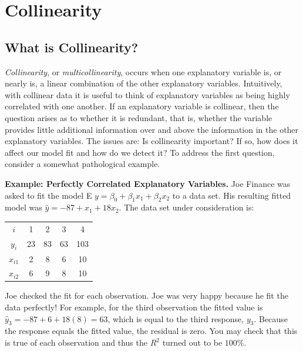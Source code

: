\linejed

\section{Collinearity}

\subsection{What is Collinearity?}

\textit{Collinearity}, or \textit{multicollinearity}, occurs when
one explanatory variable is, or nearly is, a linear combination of
the other explanatory variables. Intuitively, with collinear data it
is useful to think of explanatory variables as being highly
correlated with one another. If an explanatory variable is
collinear, then the question arises as to whether it is redundant,
that is, whether the variable provides little additional information
over and above the information in the other explanatory variables.
The issues are: Is collinearity important? If so, how does it affect
our model fit and how do we detect it? To address the first
question, consider a somewhat pathological example.

\linejed

\textbf{Example: Perfectly Correlated Explanatory Variables.} Joe
Finance was asked to fit the model E
$y=\beta_0+\beta_1x_1+\beta_2x_2$ to a data set. His resulting
fitted model was $\hat{y}=-87+x_1+18x_2.$  The data set under
consideration is:

\begin{center}
\begin{tabular}{ccccc}
\hline
$i$ & 1 & 2 & 3 & 4 \\
$y_i$ & 23 & 83 & 63 & 103 \\
$x_{i1}$ & 2 & 8 & 6 & 10 \\
$x_{i2}$ & 6 & 9 & 8 & 10 \\ \hline
\end{tabular}%
\end{center}

Joe checked the fit for each observation. Joe was very happy because
he fit the data perfectly! For example, for the third observation
the fitted value is $\hat{y}_3=-87+6+18(8)=63$, which is equal to
the third response, $y_3 $. Because the response equals the fitted
value, the residual is zero. You may check that this is true of each
observation and thus the $R^2$ turned out to be $100\%$.

